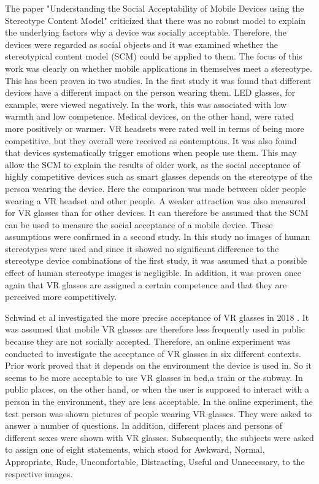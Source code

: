 \documentclass[sigchi]{acmart}
\begin{document}
The paper "Understanding the Social Acceptability of Mobile Devices using the Stereotype Content Model" \cite{schwind2019understanding} criticized that there was no robust model to explain  the underlying factors why a device was socially acceptable. Therefore, the devices were regarded as social objects and it was examined whether the stereotypical content model (SCM) could be applied to them. The focus of this work was clearly on whether mobile applications in themselves meet a stereotype. This has been proven in two studies. In the first study it was found that different devices have a different impact on the person wearing them. LED glasses, for example, were viewed negatively. In the work, this was associated with low warmth and low competence. Medical devices, on the other hand, were rated more positively or warmer. VR headsets were rated well in terms of being more competitive, but they overall were received as contemptous. It was also found that devices systematically trigger emotions when people use them. This may allow the SCM to explain the results of older work, as the social acceptance of highly competitive devices such as smart glasses depends on the stereotype of the person wearing the device. Here the comparison was made between older people wearing a VR headset and other people. A weaker attraction was also measured for VR glasses than for other devices. It can therefore be assumed that the SCM can be used to measure the social acceptance of a mobile device. These assumptions were confirmed in a second study. In this study no images of human stereotypes were used and since it showed no significant difference to the stereotype device combinations of the first study, it was assumed that a possible effect of human stereotype images is negligible. In addition, it was proven once again that VR glasses are assigned a certain competence and that they are perceived more competitively.

Schwind et al investigated the more precise acceptance of VR glasses in 2018 \cite{schwind2018virtual}. It was assumed that mobile VR glasses are therefore less frequently used in public because they are not socially accepted. Therefore, an online experiment was conducted to investigate the acceptance of VR glasses in six different contexts. Prior work proved that it depends on the environment the device is used in. So it seems to be more acceptable to use VR glasses in bed,a train or the subway. In public places, on the other hand, or when the user is supposed to interact with a person in the environment, they are less acceptable. 
In the online experiment, the test person was shown pictures of people wearing VR glasses. They were asked to answer a number of questions. In addition, different places and persons of different sexes were shown with VR glasses. Subsequently, the subjects were asked to assign one of eight statements, which stood for Awkward, Normal, Appropriate, Rude, Uncomfortable, Distracting, Useful and Unnecessary, to the respective images.
\end{document}
